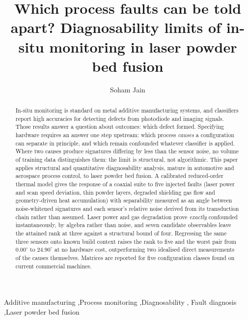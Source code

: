 \documentclass[final,5p,times,twocolumn]{elsarticle}
\begin{document}
\begin{frontmatter}

\title{Which process faults can be told apart? Diagnosability limits of
in-situ monitoring in laser powder bed fusion}

\author[a]{Soham Jain}

\begin{abstract}
In-situ monitoring is standard on metal additive manufacturing systems, and
classifiers report high accuracies for detecting defects from photodiode and
imaging signals. Those results answer a question about outcomes: which defect
formed. Specifying hardware requires an answer one step upstream: which process
\emph{causes} a configuration can separate in principle, and which remain
confounded whatever classifier is applied. Where two causes produce signatures
differing by less than the sensor noise, no volume of training data distinguishes
them: the limit is structural, not algorithmic. This paper applies structural and
quantitative diagnosability analysis, mature in automotive and aerospace process
control, to laser powder bed fusion. A calibrated reduced-order thermal model
gives the response of a coaxial suite to five injected faults (laser power and
scan speed deviation, thin powder layers, degraded shielding gas flow and
geometry-driven heat accumulation) with separability measured as an angle
between noise-whitened signatures and each sensor's relative noise derived from
its transduction chain rather than assumed. Laser power and gas degradation prove
\emph{exactly} confounded instantaneously, by algebra rather than noise, and
seven candidate observables leave the attained rank at three against a structural
bound of four. Regressing the same three sensors onto known build context raises
the rank to five and the worst pair from $0.00^\circ$ to $24.90^\circ$ at no
hardware cost, outperforming two idealised direct measurements of the causes
themselves. Matrices are reported for five configuration classes found on current
commercial machines.
\end{abstract}

\begin{keyword}
Additive manufacturing \sep Process monitoring \sep Diagnosability \sep
Fault diagnosis \sep Laser powder bed fusion
\end{keyword}

\end{frontmatter}
\end{document}
